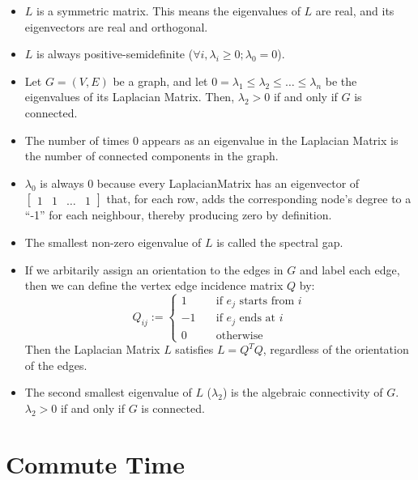 \begin{itemize}
\item $L$ is a symmetric matrix. This means the eigenvalues of $L$ are real, and
its eigenvectors are real and orthogonal.
\item $L$ is always positive-semidefinite ($\forall i, \lambda_{i} \geq 0; 
\lambda_{0} = 0$).
\item Let $G = (V,E)$ be a graph, and let $0 = \lambda_{1} \leq \lambda_{2}
\leq \ldots \leq \lambda_{n}$ be the eigenvalues of its Laplacian Matrix. Then, 
$\lambda_{2} > 0$ if and only if $G$ is connected.
\item The number of times $0$ appears as an eigenvalue in the Laplacian Matrix 
is the number of connected components in the graph.
\item $\lambda_{0}$ is always $0$ because every \gls{LaplacianMatrix} has an 
eigenvector of $\begin{bmatrix} 1 & 1 & \ldots & 1 \end{bmatrix}$ that, for each
row, adds the corresponding node's degree to a ``-1'' for each neighbour, 
thereby producing zero by definition.
\item The smallest non-zero eigenvalue of $L$ is called the spectral gap.
\item If we arbitarily assign an orientation to the edges in $G$ and label each
edge, then we can define the vertex edge incidence matrix $Q$ by:
\begin{displaymath}
Q_{ij} := 
    \left\{
        \begin{array}{ll}
            1 &     \quad \text{if $e_{j}$ starts from $i$} \\
            -1 &    \quad \text{if $e_{j}$ ends at $i$} \\
            0 &     \quad \text{otherwise}
        \end{array}
    \right.
\end{displaymath}
Then the Laplacian Matrix $L$ satisfies $L = Q^{T}Q$, regardless of the 
orientation of the edges.
\item The second smallest eigenvalue of $L$ ($\lambda_{2}$) is the algebraic 
connectivity of $G$. $\lambda_{2} > 0$ if and only if $G$ is connected.
\end{itemize}

\section{Commute Time}
\label{sec:commuteTime}

